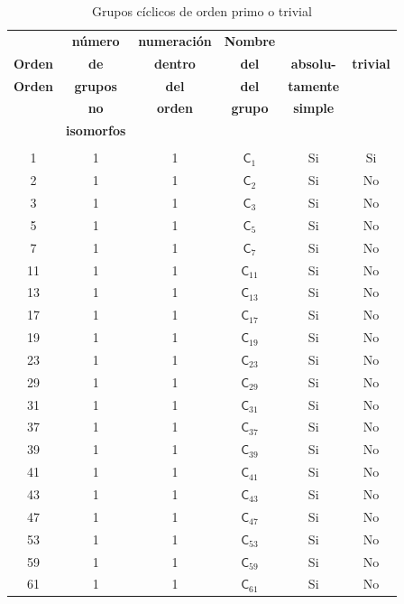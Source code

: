 \documentclass[12pt,a4paper,fleqn,spanish,final,openright]{extbook}
\theoremstyle{definition}
\theoremstyle{remark}
\begin{document}
\begin{table}[h!]
  \begin{center}
    \caption{Grupos cíclicos de orden primo o trivial}
    \label{tab:GruposCíclicosSimples}
    \begin{tabular}{|c|c|c|c|c|c|} %
    \hline
      \textbf{} & \textbf{número} &\textbf{numeración} & \textbf{Nombre} & \textbf{} & \textbf{}\\
      \textbf{Orden} & \textbf{de} &\textbf{dentro} & \textbf{del} & \textbf{absolu-} & \textbf{trivial}\\
      \textbf{Orden} & \textbf{grupos} &\textbf{del} & \textbf{del} & \textbf{tamente} & \textbf{}\\
      \textbf{} & \textbf{no} &\textbf{orden} & \textbf{grupo} & \textbf{simple} & \textbf{}\\
      \textbf{} & \textbf{isomorfos} &\textbf{} & \textbf{} & \textbf{} & \textbf{}\\
      \hline\\
      \hline
      1 & 1 & 1 & $\textsf{C}_1$ & Si & Si\\
      \hline
      2 & 1 & 1  & $\textsf{C}_2$ & Si & No\\
      \hline
      3 & 1 & 1  & $\textsf{C}_3$ & Si & No\\
      \hline
      5 & 1 & 1  & $\textsf{C}_5$ & Si & No\\
      \hline
      7 & 1 & 1  & $\textsf{C}_7$ & Si & No\\
      \hline
      11 & 1 & 1  & $\textsf{C}_{11}$ & Si & No\\
      \hline
      13 & 1 & 1  & $\textsf{C}_{13}$ & Si & No\\
      \hline
      17 & 1 & 1  & $\textsf{C}_{17}$ & Si & No\\
      \hline
      19 & 1 & 1  & $\textsf{C}_{19}$ & Si & No\\
      \hline
      23 & 1 & 1  & $\textsf{C}_{23}$ & Si & No\\
      \hline
      29 & 1 & 1  & $\textsf{C}_{29}$ & Si & No\\
      \hline
      31 & 1 & 1  & $\textsf{C}_{31}$ & Si & No\\
      \hline
      37 & 1 & 1  & $\textsf{C}_{37}$ & Si & No\\
      \hline
      39 & 1 & 1  & $\textsf{C}_{39}$ & Si & No\\
      \hline
      41 & 1 & 1  & $\textsf{C}_{41}$ & Si & No\\
      \hline
      43 & 1 & 1  & $\textsf{C}_{43}$ & Si & No\\
      \hline
      47 & 1 & 1  & $\textsf{C}_{47}$ & Si & No\\
      \hline
      53 & 1 & 1  & $\textsf{C}_{53}$ & Si & No\\
      \hline
      59 & 1 & 1  & $\textsf{C}_{59}$ & Si & No\\
      \hline
      61 & 1 & 1  & $\textsf{C}_{61}$ & Si & No\\
      \hline
    \end{tabular}
  \end{center}
\end{table}
\end{document}
